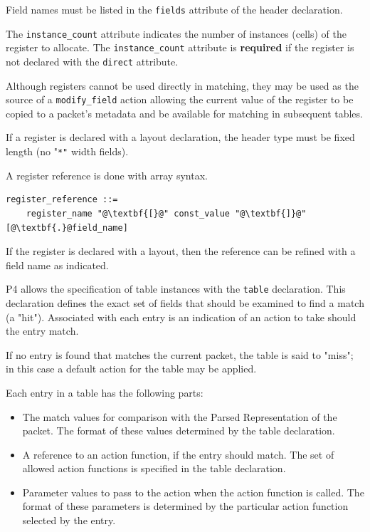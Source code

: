 \documentclass[12pt]{article}
\begin{document}
Field names must be listed in the \texttt{fields} attribute of the 
header declaration. 

The \texttt{instance_count} attribute indicates the number of 
instances (cells) of the register to allocate. The 
\texttt{instance_count} attribute is \textbf{required} if the 
register is not declared with the \texttt{direct} attribute.

Although registers cannot be used directly in matching, they may be used as 
the source of a \texttt{modify_field} action allowing the current value 
of the register to be copied to a packet's metadata and be available 
for matching in subsequent tables.

If a register is declared with a layout declaration, the header type must 
be fixed length (no "\texttt{*"} width fields).

A register reference is done with array syntax.

\begin{lstlisting}[frame=single,backgroundcolor=\color{bnfgreen},escapechar=\@]
register_reference ::=
    register_name "@\textbf{[}@" const_value "@\textbf{]}@" [@\textbf{.}@field_name]
\end{lstlisting}


If the register is declared with a layout, then the reference can be refined 
with a field name as indicated.


P4 allows the specification of table instances with the \texttt{table}
declaration. This declaration defines the exact set of fields that
should be examined to find a match (a "hit").  Associated with each
entry is an indication of an action to take should the entry match.

If no entry is found that matches the current packet, the table is said to 
"miss"; in this case a default action for the table may be applied.

Each entry in a \matchaction table has the following parts: 

\begin{itemize}
\item
The match values for comparison with the Parsed Representation of the packet. 
The format of these values determined by the table declaration.
\item
A reference to an action function, if the entry should match. The set
of allowed action functions is specified in the table declaration.
\item
Parameter values to pass to the action when the action function is called. 
The format of these parameters is determined by the particular action function 
selected by the entry.
\end{itemize}
\end{document}
